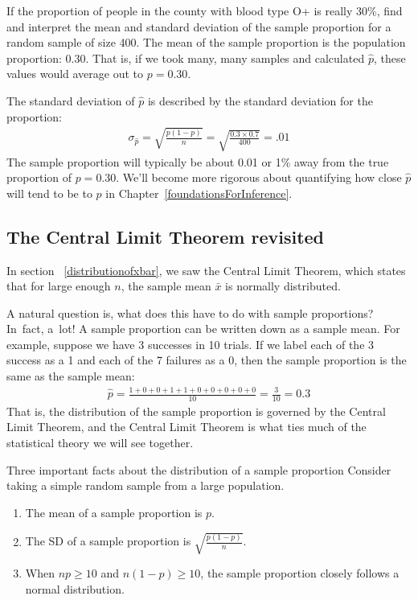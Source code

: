 \begin{examplewrap}
\begin{nexample}{If the proportion of people in the county with blood type O+ is really 30\%, find and interpret the mean and standard deviation of the sample proportion for a random sample of size 400.}
The mean of the sample proportion is the population proportion: 0.30. That is, if we took many, many samples and calculated $\hat{p}$, these values would average out to $p = 0.30$.

The standard deviation of $\hat{p}$ is described by the standard deviation for the proportion:
\begin{align*}
\sigma_{\hat{p}}
	= \sqrt{\frac{p(1-p)}{n}}
	= \sqrt{\frac{0.3 \times 0.7}{400}}
	= .01
\end{align*}
The sample proportion will typically be about 0.01 or 1\% away from the true proportion of $p = 0.30$. We'll become more rigorous about quantifying how close $\hat{p}$ will tend to be to $p$ in Chapter~\ref{foundationsForInference}.
\end{nexample}
\end{examplewrap}

\subsection{The Central Limit Theorem revisited}

In section ~\ref{distributionofxbar}, we saw the Central Limit Theorem, which states that for large enough $n$, the sample mean $\bar{x}$ is normally distributed.

A natural question is, what does this have to do with sample proportions? In~fact, a~lot! A sample proportion can be written down as a sample mean. For example, suppose we have 3 successes in 10 trials. If we label each of the 3 success as a 1 and each of the 7 failures as a 0, then the sample proportion is the same as the sample mean:
\begin{align*}
\hat{p}
	= \frac{1 + 0 + 0 + 1 + 1 + 0 + 0 + 0 + 0 + 0}{10}
	= \frac{3}{10}
	= 0.3
\end{align*}
That is, the distribution of the sample proportion is governed by the Central Limit Theorem, and the Central Limit Theorem is what ties much of the statistical theory we will see together.


\begin{onebox}{Three important facts about the distribution of a sample proportion }
Consider taking a simple  random sample from a large population.
\begin{enumerate}
\setlength{\itemsep}{0mm}
\item The mean of a sample proportion is $p$.
\item The SD of a sample proportion is $\sqrt{\frac{p(1-p)}{n}}$.
\item When $np \geq 10$ and $n(1-p) \geq 10$, the sample proportion closely follows a normal distribution. 
\end{enumerate}\end{onebox}

